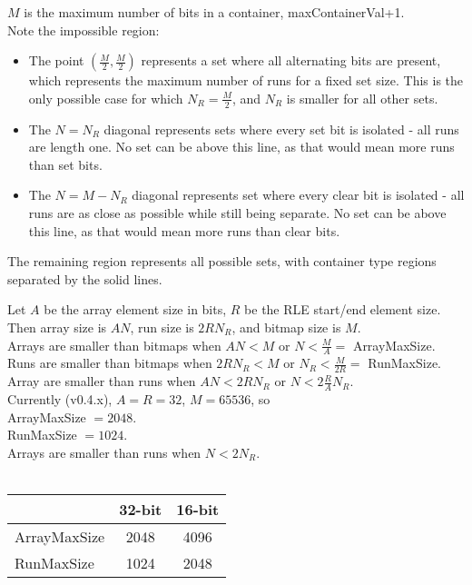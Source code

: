 \documentclass{article} %
\begin{document}
$M$ is the maximum number of bits in a container, maxContainerVal+1.\\

Note the impossible region:
\begin{itemize}
  \item The point $(\frac{M}{2}, \frac{M}{2})$ represents a set where all alternating bits are
present, which represents the maximum number of runs for a fixed set size. This is the only possible case for which $N_R = \frac{M}{2}$, and $N_R$ is smaller for all other sets.
  \item The $N = N_R$ diagonal represents sets where every set bit is isolated - all runs are length one. No set can be above this line, as that would mean more runs than set bits.
  \item The $N = M-N_R$ diagonal represents set where every clear bit is isolated - all runs are as close as possible while still being separate. No set can be above this line, as that would mean more runs than clear bits.

\end{itemize}

The remaining region represents all possible sets,
with container type regions separated by the solid lines.

\bigskip

Let $A$ be the array element size in bits, $R$ be the RLE start/end element size. Then array size is $AN$, run size is
$2RN_R$, and bitmap size is $M$.\\

Arrays are smaller than bitmaps when $AN < M$ or $N < \frac{M}{A} = $ ArrayMaxSize.\\
Runs are smaller than bitmaps when $2RN_R < M$ or $N_R < \frac{M}{2R} = $ RunMaxSize.\\
Array are smaller than runs when $AN < 2RN_R$ or $N < 2\frac{R}{A} N_R$.\\

Currently (v0.4.x), $A = R = 32$, $M = 65536$, so\\ 

ArrayMaxSize $ = 2048$.\\
RunMaxSize $ = 1024$.\\
Arrays are smaller than runs when $N < 2 N_R$.\\
\\
\begin{tabular}{l | c | c}
    & 32-bit & 16-bit \\
  \hline
  ArrayMaxSize & 2048 & 4096 \\
  \hline
  RunMaxSize & 1024 & 2048 \\
\end{tabular}
\end{document}

